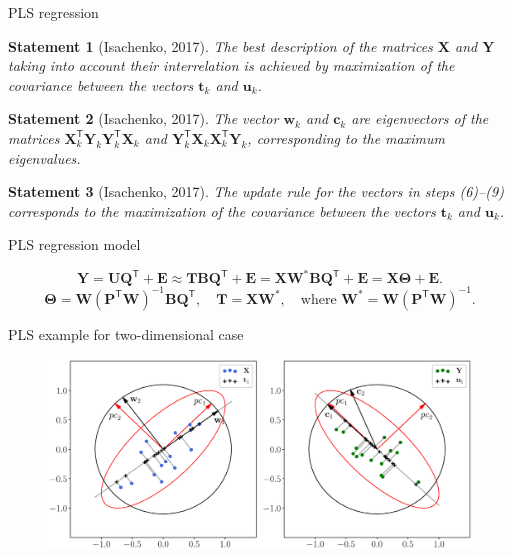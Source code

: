 \documentclass[9pt]{beamer}
\newcommand{\bw}{\mathbf{w}}
\newcommand{\bY}{\mathbf{Y}}
\newcommand{\bX}{\mathbf{X}}
\newcommand{\bu}{\mathbf{u}}
\newcommand{\bt}{\mathbf{t}}
\newcommand{\bc}{\mathbf{c}}
\newcommand{\bP}{\mathbf{P}}
\newcommand{\bT}{\mathbf{T}}
\newcommand{\bB}{\mathbf{B}}
\newcommand{\bQ}{\mathbf{Q}}
\newcommand{\bE}{\mathbf{E}}
\newcommand{\bU}{\mathbf{U}}
\newcommand{\bW}{\mathbf{W}}
\newcommand{\bTheta}{\boldsymbol{\Theta}}
\newcommand{\T}{\mathsf{T}}
\newtheorem{statement}{Statement}
\begin{document}
\begin{frame}{PLS regression}

\begin{statement}[Isachenko, 2017]
The best description of the matrices $\bX$ and $\bY$ taking into account their interrelation is achieved by maximization of the covariance between the vectors $\bt_k$ and $\bu_k$.
\end{statement}
\begin{statement}[Isachenko, 2017]
	The vector $\bw_k$ and $\bc_k$ are eigenvectors of the matrices $\bX_k^{\T} \bY_k \bY_k^{\T} \bX_k$ and $\bY_k^{\T} \bX_k \bX_k^{\T} \bY_k$, corresponding to the maximum eigenvalues.
\end{statement}
\begin{statement}[Isachenko, 2017]
	The update rule for the vectors in steps (6)--(9) corresponds to the maximization of the covariance between the vectors $\bt_k$ and $\bu_k$.
\end{statement}

\begin{block}{PLS regression model}

\[
\bY = \bU \bQ^{\T} + \bE \approx \bT \bB \bQ^{\T}+ \bE = \bX \bW^* \bB \bQ^{\T} + \bE = \bX \bTheta + \bE.
\]
\[
\bTheta = \bW (\bP^{\T} \bW)^{-1} \bB \bQ^{\T}, \quad \bT = \bX \bW^*, \quad \text{where } \bW^* = \bW (\bP^{\T} \bW)^{-1}.
\]
\end{block}
\end{frame}
\begin{frame}{PLS example for two-dimensional case}
\begin{figure}[h]
\centering
\includegraphics[width=\linewidth]{figs/PLSFigure.eps}
\end{figure}
\end{frame}
\end{document}
